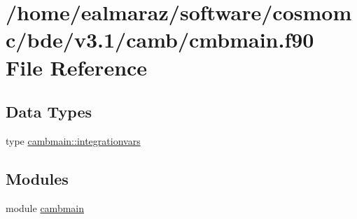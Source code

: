 \hypertarget{cmbmain_8f90}{}\section{/home/ealmaraz/software/cosmomc/bde/v3.1/camb/cmbmain.f90 File Reference}
\label{cmbmain_8f90}
\subsection*{Data Types}
\begin{DoxyCompactItemize}
\item 
type \mbox{\hyperlink{structcambmain_1_1integrationvars}{cambmain\+::integrationvars}}
\end{DoxyCompactItemize}
\subsection*{Modules}
\begin{DoxyCompactItemize}
\item 
module \mbox{\hyperlink{namespacecambmain}{cambmain}}
\end{DoxyCompactItemize}
